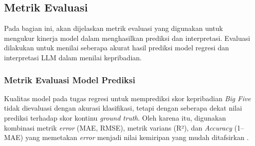 
\subsection{Metrik Evaluasi}

Pada bagian ini, akan dijelaskan metrik evaluasi yang digunakan untuk mengukur kinerja model dalam menghasilkan prediksi dan interpretasi. Evaluasi dilakukan untuk menilai seberapa akurat hasil prediksi model regresi dan interpretasi LLM dalam menilai kepribadian.

\subsubsection{Metrik Evaluasi Model Prediksi}

Kualitas model pada tugas regresi untuk memprediksi skor kepribadian \textit{Big Five} tidak dievaluasi dengan akurasi klasifikasi, tetapi dengan seberapa dekat nilai prediksi terhadap skor kontinu \textit{ground truth}. Oleh karena itu, digunakan kombinasi metrik \textit{error} (MAE, RMSE), metrik varians (R²), dan \textit{Accuracy} (1–MAE) yang memetakan \textit{error} menjadi nilai kemiripan yang mudah ditafsirkan \parencite{Plevris2022, Chicco2021}.

